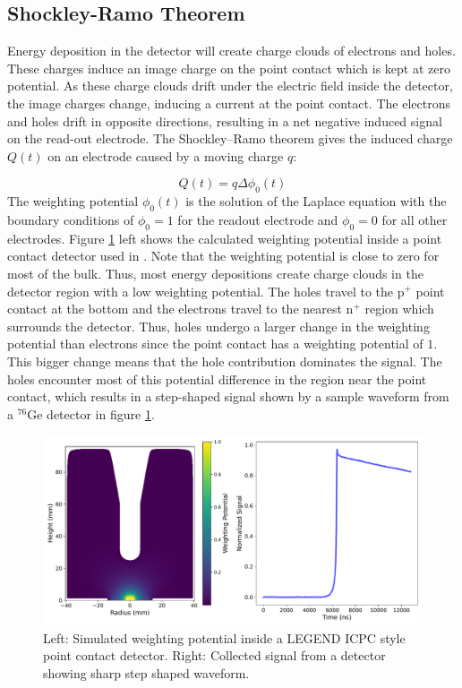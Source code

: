 \subsection{Shockley-Ramo Theorem}
Energy deposition in the detector will create charge clouds of electrons and holes. These charges induce an image charge on the point contact which is kept at zero potential. As these charge clouds drift under the electric field inside the detector, the image charges change, inducing a current at the point contact. The electrons and holes drift in opposite directions, resulting in a net negative induced signal on the read-out electrode. The Shockley–Ramo theorem gives the induced charge $Q(t)$ on an electrode caused by a moving charge $q$:

\begin{equation}\label{wp_eq}
Q(t)=q\Delta \phi_0(t)
\end{equation}
\noindent
The weighting potential $\phi_0(t)$ is the solution of the Laplace equation with the boundary conditions of $\phi_0=1$ for the readout electrode and $\phi_0=0$ for all other electrodes. Figure \ref{fig:wp_signal} left shows the calculated weighting potential inside a point contact detector used in {\Ltwo}. Note that the weighting potential is close to zero for most of the bulk. Thus, most energy depositions create charge clouds in the detector region with a low weighting potential. The holes travel to the p$^+$ point contact at the bottom and the electrons travel to the nearest n$^+$ region which surrounds the detector. Thus, holes undergo a larger change in the weighting potential than electrons since the point contact has a weighting potential of $1$. This bigger change means that the hole contribution dominates the signal. The holes encounter most of this potential difference in the region near the point contact, which results in a step-shaped signal shown by a sample waveform from a ${}^{76}$Ge detector in figure \ref{fig:wp_signal}.

  \begin{figure}[htb]
  \centering
  \includegraphics[trim=0 0.3cm 0 0,clip,width=\linewidth]{ch2/figs/wp_det.pdf}
  \caption{Left: Simulated weighting potential inside a LEGEND ICPC style point contact detector. Right: Collected signal from a detector showing sharp step shaped waveform.}
    \label{fig:wp_signal}
  \end{figure}

